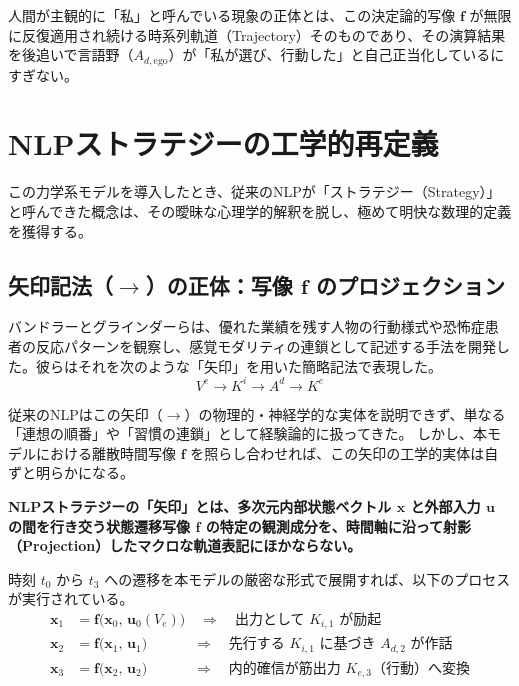 人間が主観的に「私」と呼んでいる現象の正体とは、この決定論的写像 $\boldsymbol{f}$ が無限に反復適用され続ける時系列軌道（Trajectory）そのものであり、その演算結果を後追いで言語野（$A_{d,\mathrm{ego}}$）が「私が選び、行動した」と自己正当化しているにすぎない。

\section{NLPストラテジーの工学的再定義}

この力学系モデルを導入したとき、従来のNLPが「ストラテジー（Strategy）」と呼んできた概念は、その曖昧な心理学的解釈を脱し、極めて明快な数理的定義を獲得する。

\subsection{矢印記法（$\longrightarrow$）の正体：写像 $\boldsymbol{f}$ のプロジェクション}
バンドラーとグラインダーらは、優れた業績を残す人物の行動様式や恐怖症患者の反応パターンを観察し、感覚モダリティの連鎖として記述する手法を開発した。彼らはそれを次のような「矢印」を用いた簡略記法で表現した。
\begin{equation}
    V^e \longrightarrow K^i \longrightarrow A^d \longrightarrow K^e
\end{equation}

従来のNLPはこの矢印（$\longrightarrow$）の物理的・神経学的な実体を説明できず、単なる「連想の順番」や「習慣の連鎖」として経験論的に扱ってきた。
しかし、本モデルにおける離散時間写像 $\boldsymbol{f}$ を照らし合わせれば、この矢印の工学的実体は自ずと明らかになる。

\textbf{NLPストラテジーの「矢印」とは、多次元内部状態ベクトル $\boldsymbol{x}$ と外部入力 $\boldsymbol{u}$ の間を行き交う状態遷移写像 $\boldsymbol{f}$ の特定の観測成分を、時間軸に沿って射影（Projection）したマクロな軌道表記にほかならない。}

時刻 $t_0$ から $t_3$ への遷移を本モデルの厳密な形式で展開すれば、以下のプロセスが実行されている。
\begin{align}
    \boldsymbol{x}_1 &= \boldsymbol{f}\big( \boldsymbol{x}_0, \, \boldsymbol{u}_0(V_e) \big) \quad \Longrightarrow \quad \text{出力として } K_{i,1} \text{ が励起} \\
    \boldsymbol{x}_2 &= \boldsymbol{f}\big( \boldsymbol{x}_1, \, \boldsymbol{u}_1 \big) \quad\quad\quad\; \Longrightarrow \quad \text{先行する } K_{i,1} \text{ に基づき } A_{d,2} \text{ が作話} \\
    \boldsymbol{x}_3 &= \boldsymbol{f}\big( \boldsymbol{x}_2, \, \boldsymbol{u}_2 \big) \quad\quad\quad\; \Longrightarrow \quad \text{内的確信が筋出力 } K_{e,3} \text{（行動）へ変換}
\end{align}

